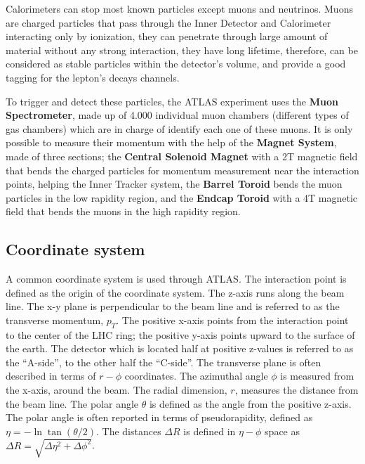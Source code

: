 Calorimeters can stop most known particles except muons and neutrinos. Muons are charged particles that pass through the
Inner Detector and Calorimeter interacting only by ionization, they can penetrate through large amount of material without any strong
interaction, they have long lifetime, therefore, can be considered as stable particles within the detector's volume, and
provide a good tagging for the lepton's decays channels.\par

To trigger and detect these particles, the ATLAS experiment uses the {\bf Muon Spectrometer}, made up of 4.000
individual muon chambers (different types of gas chambers) which are in charge of identify each one of these muons. It
is only possible to measure their momentum with the help of the {\bf Magnet System}, made of three sections; the {\bf
Central Solenoid Magnet} with a 2T magnetic field that bends the charged particles for momentum measurement near the
interaction points, helping the Inner Tracker system, the {\bf Barrel Toroid} bends the muon particles in the low
rapidity region, and the {\bf Endcap Toroid} with a 4T magnetic field that bends the muons in the high rapidity
region.\par
\subsection{Coordinate system}

A common coordinate system is used through ATLAS. The interaction point is defined as the origin of the coordinate
system. The z-axis runs along the beam line. The x-y plane is perpendicular to the beam line and is referred to as the
transverse momentum, $p_T$. The positive x-axis points from the interaction point to the center of the LHC ring; the
positive y-axis points upward to the surface of the earth. The detector which is located half at positive z-values is
referred to as the ``A-side'', to the other half the ``C-side''. The transverse plane is often described in terms of
$r-\phi$ coordinates. The azimuthal angle $\phi$ is measured from the x-axis, around the beam. The radial dimension,
$r$, measures the distance from the beam line. The polar angle $\theta$ is defined as the angle from the positive
z-axis. The polar angle is often reported in terms of pseudorapidity, defined as $\eta = -\ln \tan (\theta/2)$. The
distances $\Delta R$ is defined in $\eta-\phi$ space as $\Delta R = \sqrt{\Delta \eta^2 + \Delta \phi^2}$.\par




